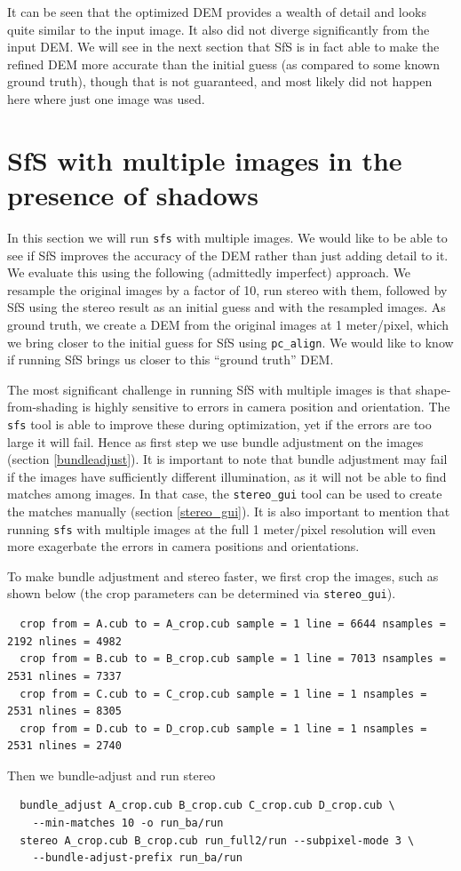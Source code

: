 It can be seen that the optimized DEM provides a wealth of detail and
looks quite similar to the input image. It also did not diverge
significantly from the input DEM. We will see in the next section that
SfS is in fact able to make the refined DEM more accurate than the
initial guess (as compared to some known ground truth), though that is
not guaranteed, and most likely did not happen here where just one image
was used.

\section{SfS with multiple images in the presence of shadows}

In this section we will run \texttt{sfs} with multiple images. We would
like to be able to see if SfS improves the accuracy of the DEM rather
than just adding detail to it. We evaluate this using the following
(admittedly imperfect) approach. We resample the original images by a
factor of 10, run stereo with them, followed by SfS using the stereo
result as an initial guess and with the resampled images. As ground
truth, we create a DEM from the original images at 1 meter/pixel, which
we bring closer to the initial guess for SfS using
\texttt{pc\_align}. We would like to know if running SfS brings us
closer to this ``ground truth'' DEM.

The most significant challenge in running SfS with multiple images is
that shape-from-shading is highly sensitive to errors in camera position
and orientation. The \texttt{sfs} tool is able to improve these during
optimization, yet if the errors are too large it will fail.  Hence as
first step we use bundle adjustment on the images (section
\ref{bundleadjust}). It is important to note that bundle adjustment
may fail if the images have sufficiently different illumination, as
it will not be able to find matches among images. In that case, the
\texttt{stereo\_gui} tool can be used to create the matches manually
(section \ref{stereo_gui}). It is also important to mention that
running \texttt{sfs} with multiple images at the full 1 meter/pixel
resolution will even more exagerbate the errors in camera
positions and orientations.

To make bundle adjustment and stereo faster, we first crop the images,
such as shown below (the crop parameters can be determined via
\texttt{stereo\_gui}).
\begin{verbatim}
  crop from = A.cub to = A_crop.cub sample = 1 line = 6644 nsamples = 2192 nlines = 4982
  crop from = B.cub to = B_crop.cub sample = 1 line = 7013 nsamples = 2531 nlines = 7337
  crop from = C.cub to = C_crop.cub sample = 1 line = 1 nsamples = 2531 nlines = 8305
  crop from = D.cub to = D_crop.cub sample = 1 line = 1 nsamples = 2531 nlines = 2740
\end{verbatim}
Then we bundle-adjust and run stereo
\begin{verbatim}
  bundle_adjust A_crop.cub B_crop.cub C_crop.cub D_crop.cub \
    --min-matches 10 -o run_ba/run
  stereo A_crop.cub B_crop.cub run_full2/run --subpixel-mode 3 \
    --bundle-adjust-prefix run_ba/run
\end{verbatim}

